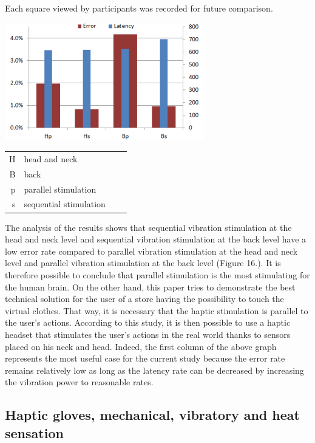 \documentclass[12pt, a4paper]{article}
\begin{document}
\begin{multicols}{2}
Each square viewed by participants was recorded for future comparison\cite{whc}.

\vspace*{3mm}
\captionsetup{type=figure}
\includegraphics[width=.49\textwidth]{DataResults.png}
\vspace*{3mm}

\begin{tabular}{r@{: }l r@{: }l}
H & head and neck\\B & back \\p & parallel stimulation\\s & sequential stimulation
\end{tabular}
\vspace*{3mm}

The analysis of the results shows that sequential vibration stimulation at the head and neck level and sequential vibration stimulation at the back level have a low error rate compared to parallel vibration stimulation at the head and neck level and parallel vibration stimulation at the back level (Figure 16.). It is therefore possible to conclude that parallel stimulation is the most stimulating for the human brain\cite{whc}.
On the other hand, this paper tries to demonstrate the best technical solution for the user of a store having the possibility to touch the virtual clothes. That way, it is necessary that the haptic stimulation is parallel to the user's actions. According to this study, it is then possible to use a haptic headset that stimulates the user's actions in the real world thanks to sensors placed on his neck and head. Indeed, the first column of the above graph represents the most useful case for the current study because the error rate remains relatively low as long as the latency rate can be decreased by increasing the vibration power to reasonable rates\cite{whc}.

\subsection{Haptic gloves, mechanical, vibratory and heat sensation}


\end{multicols}
\end{document}
